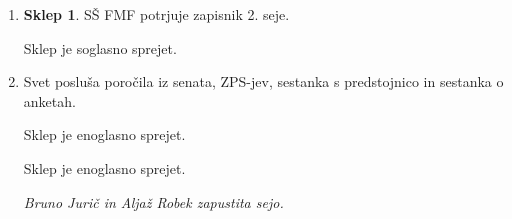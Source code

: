 \documentclass[12pt]{article}
\theoremstyle{definition}
\newtheorem{sklep}{Sklep}
\begin{document}
\begin{enumerate}[label =\textbf{Ad. \arabic*.}]

\item 
\begin{sklep} S\v{S} FMF potrjuje zapisnik 2. seje.\end{sklep}

\noindent Sklep je soglasno sprejet.


\item Svet poslu\v{s}a poro\v{c}ila iz senata, ZPS-jev, sestanka s predstojnico in sestanka o anketah.


\noindent Sklep je enoglasno sprejet.


\noindent Sklep je enoglasno sprejet.

\noindent\textit{Bruno Juri\v{c} in Alja\v{z} Robek zapustita sejo.}
\end{enumerate}
\end{document}
